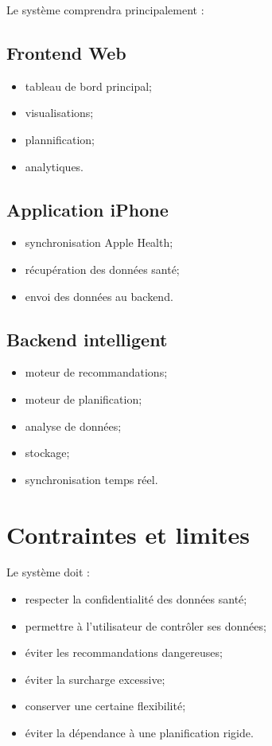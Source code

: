 \documentclass[12pt]{article}
\begin{document}
Le système comprendra principalement :

\subsection{Frontend Web}

\begin{itemize}
    \item tableau de bord principal;
    \item visualisations;
    \item plannification;
    \item analytiques.
\end{itemize}

\subsection{Application iPhone}

\begin{itemize}
    \item synchronisation Apple Health;
    \item récupération des données santé;
    \item envoi des données au backend.
\end{itemize}

\subsection{Backend intelligent}

\begin{itemize}
    \item moteur de recommandations;
    \item moteur de planification;
    \item analyse de données;
    \item stockage;
    \item synchronisation temps réel.
\end{itemize}

\section{Contraintes et limites}

Le système doit :
\begin{itemize}
    \item respecter la confidentialité des données santé;
    \item permettre à l’utilisateur de contrôler ses données;
    \item éviter les recommandations dangereuses;
    \item éviter la surcharge excessive;
    \item conserver une certaine flexibilité;
    \item éviter la dépendance à une planification rigide.
\end{itemize}
\end{document}
